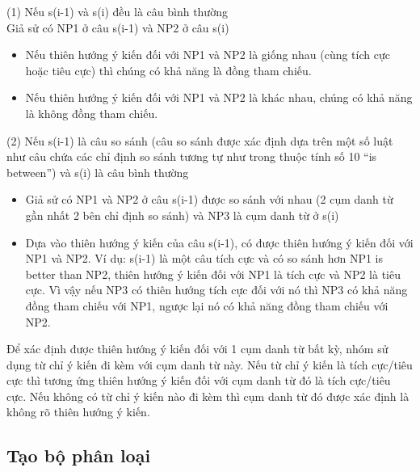\documentclass[12pt]{extarticle}
\begin{document}
				\par (1) Nếu s(i-1) và s(i) đều là câu bình thường 
				\\Giả sử có NP1 ở câu s(i-1) và NP2 ở câu s(i)
				\begin{itemize}
					\item{Nếu thiên hướng ý kiến đối với NP1 và NP2 là giống nhau (cùng tích cực hoặc tiêu cực) thì chúng có khả năng là đồng tham chiếu.}
					\item{Nếu thiên hướng ý kiến đối với NP1 và NP2 là khác nhau, chúng có khả năng là không đồng tham chiếu.}
				\end{itemize}
				(2)	Nếu s(i-1) là câu so sánh (câu so sánh được xác định dựa trên một số luật như câu chứa các chỉ định so sánh tương tự như trong thuộc tính số 10 “is between”) và s(i) là câu bình thường
				\begin{itemize}
					\item{Giả sử có NP1 và NP2 ở câu s(i-1) được so sánh với nhau (2 cụm danh từ gần nhất 2 bên chỉ định so sánh) và NP3 là cụm danh từ ở s(i)}
					\item{Dựa vào thiên hướng ý kiến của câu s(i-1), có được thiên hướng ý kiến đối với NP1 và NP2. Ví dụ: s(i-1) là một câu tích cực và có so sánh hơn NP1 is better than NP2, thiên hướng ý kiến đối với NP1 là tích cực và NP2 là tiêu cực. Vì vậy nếu NP3 có thiên hướng tích cực đối với nó thì NP3 có khả năng đồng tham chiếu với NP1, ngược lại nó có khả năng đồng tham chiếu với NP2.}
				\end{itemize}
				\par Để xác định được thiên hướng ý kiến đối với 1 cụm danh từ bất kỳ, nhóm sử dụng từ chỉ ý kiến đi kèm với cụm danh từ này. Nếu từ chỉ ý kiến là tích cực/tiêu cực thì tương ứng thiên hướng ý kiến đối với cụm danh từ đó là tích cực/tiêu cực. Nếu không có từ chỉ ý kiến nào đi kèm thì cụm danh từ đó được xác định là không rõ thiên hướng ý kiến.

		\subsection{Tạo bộ phân loại}
\end{document}
